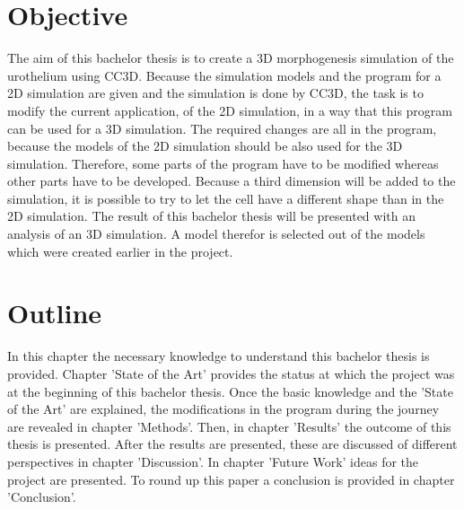 \section{Objective}
The aim of this bachelor thesis is to create a 3D morphogenesis simulation of the urothelium using \ac{CC3D}. Because the simulation models and the program for a 2D simulation are given and the simulation is done by \ac{CC3D}, the task is to modify the current application, of the 2D simulation, in a way that this program can be used for a 3D simulation. \newline
The required changes are all in the program, because the models of the 2D simulation should be also used for the 3D simulation.
Therefore, some parts of the program have to be modified whereas other parts have to be developed. Because a third dimension will be added to the simulation, it is possible to try to let the cell have a different shape than in the 2D simulation. 
The result of this bachelor thesis will be presented with an analysis of an 3D simulation. A model therefor is selected out of the models which were created earlier in the project.


\section{Outline}
In this chapter the necessary knowledge to understand this bachelor thesis is provided. Chapter 'State of the Art' provides the status at which the project was at the beginning of this bachelor thesis. Once the basic knowledge and the 'State of the Art' are explained, the modifications in the program during the journey are revealed in chapter 'Methods'. Then, in chapter 'Results' the outcome of this thesis is presented. After the results are presented, these are discussed of different perspectives in chapter 'Discussion'. In chapter 'Future Work' ideas for the project are presented. To round up this paper a conclusion is provided in chapter 'Conclusion'.